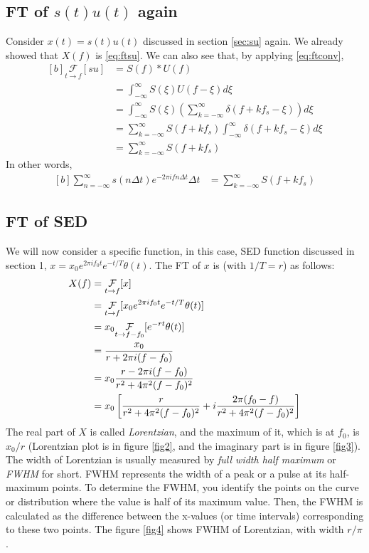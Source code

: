 \documentclass[letterpaper, 11pt]{article}
\newcommand{\fint}{\int_{-\infty}^{\infty}} %
\newcommand{\sed}[2]{#2_{0}e^{2\pi if_{0}#1}e^{-#1/T} \theta (#1)} %
\newcommand{\fsum}[1]{\sum_{#1 = -\infty}^{\infty}} %
\newcommand{\fourier}[3]{\underset{#1 \rightarrow #3}{\mathcal{F}}[#2]} %
\newcommand{\conv}[4]{\fint #3(#2)#4(#1 - #2) d#2} %
\numberwithin{equation}{section}
\numberwithin{figure}{section}
\numberwithin{table}{section}
\begin{document}
\subsection{FT of \(s(t)u(t)\) again}
Consider \(x(t) = s(t)u(t)\) discussed in section \ref{sec:su} again. We already showed that \(X(f)\) is \eqref{eq:ftsu}. We can also see that, by applying \eqref{eq:ftconv}, 
\begin{equation}
	\begin{aligned}[b]
		\fourier{t}{su}{f}
		&= S(f)*U(f)\\
		&= \conv{f}{\xi}{S}{U}\\
		&= \fint S(\xi) 
		   \left (\fsum{k} \delta (f + kf_{s}- \xi) \right ) d\xi\\
		&= \fsum{k} S(f + kf_{s}) \fint \delta (f + kf_{s} - \xi) d\xi\\
		&= \fsum{k} S(f + kf_{s}) 
	\end{aligned}
\end{equation}
In other words, 
\begin{equation}
	\begin{aligned}[b]
		\fsum{n} s(n \Delta t) e^{-2\pi ifn\Delta t} \Delta t 
			&= \fsum{k} S(f + kf_{s}) 
			\label{eq:ftsu1}
	\end{aligned}
\end{equation}

\subsection{FT of SED}
We will now consider a specific function, in this case, SED function discussed in section 1, \(x = \sed{t}{x}\). The FT of \(x\) is (with \(1/T = r\)) as follows:
\begin{equation}
	\begin{aligned}[b]
		X(f)	&= \fourier{t}{x}{f}\\
			&= \fourier{t}{\sed{t}{x}}{f}\\
			&= x_{0}\fourier{t}{e^{-rt} \theta (t)}{f - f_{0}}\\
			&= \frac{x_{0}}{r + 2\pi i(f - f_{0})} \\
			\gdef\temp{r^2 + 4\pi^{2}(f - f_{0})^2} %
			&= x_{0}\frac{r - 2\pi i(f - f_{0})}{\temp}\\
			&= x_{0}\left[\frac{r}{\temp} + i\frac{2\pi(f_{0} - f)}{\temp} \right]
	\end{aligned}
\end{equation}
The real part of \(X\) is called \emph{Lorentzian}, and the maximum of it, which is at \(f_{0}\), is \(x_{0}/r\) (Lorentzian plot is in figure \ref{fig2}, and the imaginary part is in figure \ref{fig3}). The width of Lorentzian is usually measured by \emph{full width half maximum} or \emph{FWHM} for short. FWHM represents the width of a peak or a pulse at its half-maximum points. To determine the FWHM, you identify the points on the curve or distribution where the value is half of its maximum value. Then, the FWHM is calculated as the difference between the x-values (or time intervals) corresponding to these two points. The figure \ref{fig4} shows FWHM of Lorentzian, with width \(r/\pi\).
\end{document}
